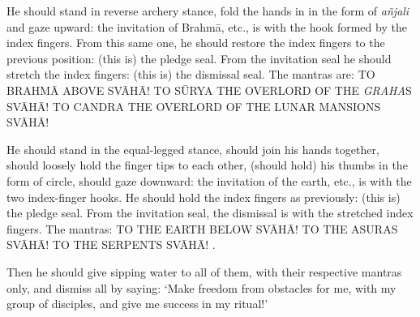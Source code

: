\documentclass[11pt]{book}
\makeatletter
\def\fakesc#1{%
  \begingroup%
  \xdef\fake@name{\csname\curr@fontshape/\f@size\endcsname}%
  \fontsize{1.3\fontdimen8\fake@name}{\baselineskip}\selectfont%
  \uppercase{#1}%
  \endgroup%
}
\newcommand{\mantra}[1]{\fakesc{#1}}
\newcommand{\skt}[1]{\emph{#1}}
\makeatother
\begin{document}
He should stand in reverse archery stance, fold the hands in in the form of \skt{añjali} and gaze upward: the invitation of Brahmā, etc., is with the hook formed by the index fingers. From this same one, he should restore the index fingers to the previous position: (this is) the pledge seal. From the invitation seal he should stretch the index fingers: (this is) the dismissal seal. The mantras are: \mantra{to Brahmā above svāhā! to Sūrya the overlord of the \skt{graha}s svāhā! to Candra the overlord of the lunar mansions svāhā!}

He should stand in the equal-legged stance, should join his hands together, should loosely hold the finger tips to each other, (should hold) his thumbs in the form of circle, should gaze downward: the invitation of the earth, etc., is with the two index-finger hooks. He should hold the index fingers as previously: (this is) the pledge seal. From the invitation seal, the dismissal is with the stretched index fingers. The mantras: \mantra{to the earth below svāhā! to the Asuras svāhā! to the serpents svāhā!}.

Then he should give sipping water to all of them, with their respective mantras only, and dismiss all by saying: `Make freedom from obstacles for me, with my group of disciples, and give me success in my ritual!' 
\end{document}
